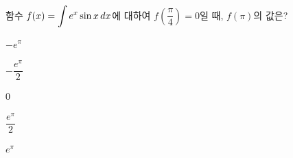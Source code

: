 \hspace*{2mm}\begin{minipage}[t]{\dimexpr\linewidth-2mm\relax}\vspace{0pt}
함수 $f(x)=\displaystyle\int e^x\sin x\mkern3mu dx$에 대하여 $f\!\left(\dfrac{\pi}{4}\right)=0$일 때, $f(\pi)$의 값은?
\begin{choices32}{\rule[-3ex]{0pt}{8ex}$-e^{\pi}$}{\rule[-3ex]{0pt}{8ex}$-\dfrac{e^{\pi}}{2}$}{\rule[-3ex]{0pt}{8ex}$0$}{\rule[-3ex]{0pt}{8ex}$\dfrac{e^{\pi}}{2}$}{\rule[-3ex]{0pt}{8ex}$e^{\pi}$}\end{choices32}\end{minipage}
